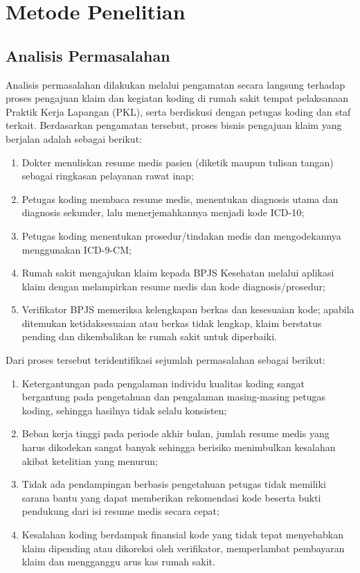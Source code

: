 \chapter{Metode Penelitian}

\section{Analisis Permasalahan}
Analisis permasalahan dilakukan melalui pengamatan secara langsung terhadap proses pengajuan klaim dan kegiatan koding di rumah sakit tempat pelaksanaan Praktik Kerja Lapangan (PKL), serta berdiskusi dengan petugas koding dan staf terkait. Berdasarkan pengamatan tersebut, proses bisnis pengajuan klaim yang berjalan adalah sebagai berikut:
\begin{enumerate}
  \item Dokter menuliskan resume medis pasien (diketik maupun tulisan tangan) sebagai ringkasan pelayanan rawat inap;
  \item Petugas koding membaca resume medis, menentukan diagnosis utama dan diagnosis sekunder, lalu menerjemahkannya menjadi kode ICD-10;
  \item Petugas koding menentukan prosedur/tindakan medis dan mengodekannya menggunakan ICD-9-CM;
  \item Rumah sakit mengajukan klaim kepada BPJS Kesehatan melalui aplikasi klaim dengan melampirkan resume medis dan kode diagnosis/prosedur;
  \item Verifikator BPJS memeriksa kelengkapan berkas dan kesesuaian kode; apabila ditemukan ketidaksesuaian atau berkas tidak lengkap, klaim berstatus pending dan dikembalikan ke rumah sakit untuk diperbaiki.
\end{enumerate}

Dari proses tersebut teridentifikasi sejumlah permasalahan sebagai berikut:
\begin{enumerate}
  \item Ketergantungan pada pengalaman individu kualitas koding sangat bergantung pada pengetahuan dan pengalaman masing-masing petugas koding, sehingga hasilnya tidak selalu konsisten;
  \item Beban kerja tinggi pada periode akhir bulan, jumlah resume medis yang harus dikodekan sangat banyak sehingga berisiko menimbulkan kesalahan akibat ketelitian yang menurun;
  \item Tidak ada pendampingan berbasis pengetahuan petugas tidak memiliki sarana bantu yang dapat memberikan rekomendasi kode beserta bukti pendukung dari isi resume medis secara cepat;
  \item Kesalahan koding berdampak finansial kode yang tidak tepat menyebabkan klaim dipending atau dikoreksi oleh verifikator, memperlambat pembayaran klaim dan mengganggu arus kas rumah sakit.
\end{enumerate}

